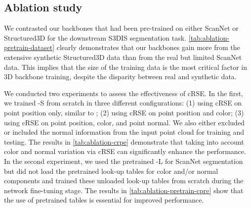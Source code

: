 \documentclass[10pt,twocolumn,letterpaper]{article}
\begin{document}
\subsection{Ablation study} \label{subsec:ablation}

 We contrasted our backbones that had been pre-trained on either ScanNet or Structured3D for the downstream S3DIS segmentation task. \cref{tab:ablation-pretrain-dataset} clearly demonstrates that our backbones gain more from the extensive synthetic Structured3D data than from the real but limited ScanNet data. This implies that the size of the training data is the most critical factor in 3D backbone training, despite the disparity between real and synthetic data.

 We conducted two experiments to assess the effectiveness of cRSE. In the first, we trained {\SST}-S from scratch in three different configurations: (1) using cRSE on point position only, similar to \cite{lai2022stratified}; (2) using cRSE on point position and color; (3) using cRSE on point position, color, and point normal. We also either excluded or included the normal information from the input point cloud for training and testing. The results in \cref{tab:ablation-crpe} demonstrate that taking into account color and normal variation via cRSE can significantly enhance the performance. In the second experiment, we used the pretrained \SST-L for ScanNet segmentation but did not load the pretrained look-up tables for color and/or normal components and trained these unloaded look-up tables from scratch during the network fine-tuning stage. The results in \cref{tab:ablation-pretrain-cpre} show that the use of pretrained tables is essential for improved performance.


\begin{table}[t]
    \centering
    \vspace{2pt}
    \caption{S3DIS segmentation results by using the backbones pretrained on different datasets.}
    \label{tab:ablation-pretrain-dataset} \vspace{-2mm}
\end{table}
\end{document}
